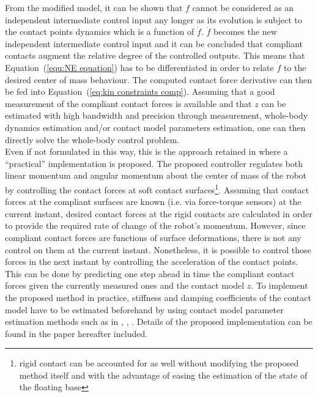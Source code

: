 \documentclass[12pt,a4paper,twoside]{article}
\begin{document}
From the modified model, it can be shown that $f$ cannot be considered as an independent intermediate control input any longer as its evolution is subject to the contact points dynamics which is a function of $\dot{f}$. $\dot{f}$ becomes the new independent intermediate control input and it can be concluded that compliant contacts augment the relative degree of the controlled outputs. This means that Equation~(\ref{equ:NE equation}) has to be differentiated in order to relate $\dot{f}$ to the desired center of mass behaviour. The computed contact force derivative can then be fed into Equation~(\ref{eq:kin constraints comp}). Assuming that a good measurement of the compliant contact forces is available and that $z$ can be estimated with high bandwidth and precision through measurement, whole-body dynamics estimation and/or contact model parameters estimation, one can then directly solve the whole-body control problem.\\

Even if not formulated in this way, this is the approach retained in \cite{AzadIROS2015} where a ``practical'' implementation is proposed. The proposed controller regulates both linear momentum and angular momentum about the center of mass of the robot by controlling the contact forces at soft contact surfaces\footnote{rigid contact can be accounted for as well without modifying the proposed method itself and with the advantage of easing the estimation of the state of the floating base}. Assuming that contact forces at the compliant surfaces are known (i.e. via force-torque sensors) at the current instant, desired contact forces at the rigid contacts are calculated in order to provide the required rate of change of the robot's momentum.  However, since compliant contact forces are functions of surface deformations, there is not  any control on them at the current instant. Nonetheless, it is possible to control those forces in the next instant by controlling the acceleration of the contact points.  This can be done by predicting one step ahead in time the compliant contact forces given the currently measured ones and the contact model $z$. To implement the proposed method in practice, stiffness and damping coefficients of the contact model have to be estimated beforehand by using contact model parameter estimation methods such as in \cite{Dallalietal13}, \cite{Diolaitietal05}, \cite{Ericksonetal03}. Details of the proposed implementation can be found in the paper hereafter included.

\newpage

\end{document}
